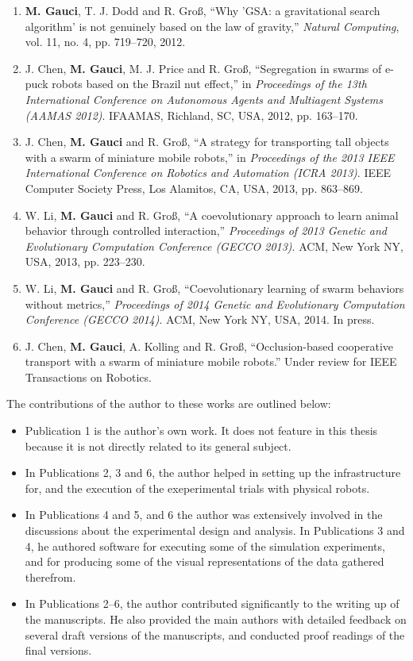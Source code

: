 \begin{enumerate}
%
\item \textbf{M. Gauci}, T. J. Dodd and R. Gro{\ss}, ``Why 'GSA: a gravitational search algorithm' is not genuinely based on the law of gravity,'' \textit{Natural Computing}, vol. 11, no. 4, pp. 719--720, 2012.
%
\item J. Chen, \textbf{M. Gauci}, M. J. Price and R. Gro{\ss}, ``Segregation in swarms of e-puck robots based on the {B}razil nut effect,'' in \textit{Proceedings of the 13th International Conference on Autonomous Agents and Multiagent Systems (AAMAS 2012)}. IFAAMAS, Richland, SC, USA, 2012, pp. 163--170.
%
\item J. Chen, \textbf{M. Gauci} and R. Gro{\ss}, ``A strategy for transporting tall objects with a swarm of miniature mobile robots,'' in \textit{Proceedings of the 2013 IEEE International Conference on Robotics and Automation (ICRA 2013)}. IEEE Computer Society Press, Los Alamitos, CA, USA, 2013, pp. 863--869.
%
\item W. Li, \textbf{M. Gauci} and R. Gro{\ss}, ``A coevolutionary approach to learn animal behavior through controlled interaction,'' \textit{Proceedings of 2013 Genetic and Evolutionary Computation Conference (GECCO 2013)}. ACM, New York NY, USA, 2013, pp. 223--230.
%
\item W. Li, \textbf{M. Gauci} and R. Gro{\ss}, ``Coevolutionary learning of swarm behaviors without metrics,'' \textit{Proceedings of 2014 Genetic and Evolutionary Computation Conference (GECCO 2014)}. ACM, New York NY, USA, 2014. In press.
%
\item J. Chen, \textbf{M. Gauci}, A. Kolling and R. Gro{\ss}, ``Occlusion-based cooperative transport with a swarm of miniature mobile robots.'' Under review for IEEE Transactions on Robotics.
%
\end{enumerate}
%
The contributions of the author to these works are outlined below:
\begin{itemize}
%
\item Publication 1 is the author's own work. It does not feature in this thesis because it is not directly related to its general subject.
%
\item In Publications 2, 3 and 6, the author helped in setting up the infrastructure for, and the execution of the exeperimental trials with physical robots.
%
\item In Publications 4 and 5, and 6 the author was extensively involved in the discussions about the experimental design and analysis. In Publications 3 and 4, he authored software for executing some of the simulation experiments, and for producing some of the visual representations of the data gathered therefrom.
%
\item In Publications 2--6, the author contributed significantly to the writing up of the manuscripts. He also provided the main authors with detailed feedback on several draft versions of the manuscripts, and conducted proof readings of the final versions.
\end{itemize}

